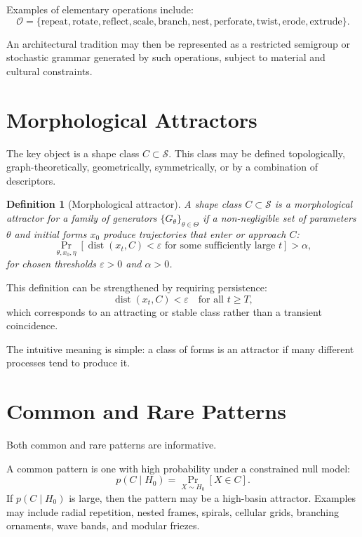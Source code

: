 \documentclass[11pt,a4paper]{article}
\newtheorem{definition}{Definition}
\DeclareMathOperator{\dist}{dist}
\DeclareMathOperator{\Prob}{Pr}
\begin{document}
Examples of elementary operations include:
\begin{equation}
    \mathcal{O}=\{\text{repeat},\text{rotate},\text{reflect},\text{scale},\text{branch},\text{nest},\text{perforate},\text{twist},\text{erode},\text{extrude}\}.
\end{equation}

An architectural tradition may then be represented as a restricted semigroup or stochastic grammar generated by such operations, subject to material and cultural constraints.

\section{Morphological Attractors}

The key object is a shape class $C \subset \mathcal{S}$. This class may be defined topologically, graph-theoretically, geometrically, symmetrically, or by a combination of descriptors.

\begin{definition}[Morphological attractor]
A shape class $C \subset \mathcal{S}$ is a morphological attractor for a family of generators $\{G_{\theta}\}_{\theta \in \Theta}$ if a non-negligible set of parameters $\theta$ and initial forms $x_0$ produce trajectories that enter or approach $C$:
\begin{equation}
    \Prob_{\theta,x_0,\eta}\left[\dist(x_t,C)<\varepsilon \text{ for some sufficiently large } t\right] > \alpha,
\end{equation}
for chosen thresholds $\varepsilon>0$ and $\alpha>0$.
\end{definition}

This definition can be strengthened by requiring persistence:
\begin{equation}
    \dist(x_t,C)<\varepsilon \quad \text{for all } t \geq T,
\end{equation}
which corresponds to an attracting or stable class rather than a transient coincidence.

The intuitive meaning is simple: a class of forms is an attractor if many different processes tend to produce it.

\section{Common and Rare Patterns}

Both common and rare patterns are informative.

A common pattern is one with high probability under a constrained null model:
\begin{equation}
    p(C\mid H_0)=\Prob_{X\sim H_0}[X\in C].
\end{equation}
If $p(C\mid H_0)$ is large, then the pattern may be a high-basin attractor. Examples may include radial repetition, nested frames, spirals, cellular grids, branching ornaments, wave bands, and modular friezes.
\end{document}
